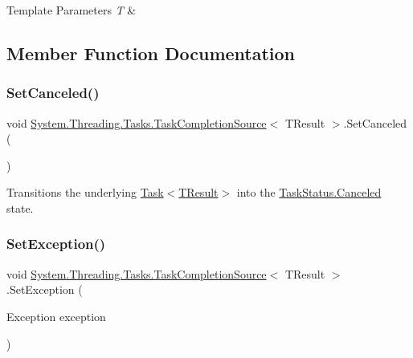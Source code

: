 \begin{DoxyTemplParams}{Template Parameters}
{\em T} & \\
\hline
\end{DoxyTemplParams}


\subsection{Member Function Documentation}
\mbox{\label{class_system_1_1_threading_1_1_tasks_1_1_task_completion_source_a051f19b8e8e34b2a19169420d6f49855}} 
\subsubsection{\texorpdfstring{Set\+Canceled()}{SetCanceled()}}
{\footnotesize\ttfamily void \hyperlink{class_system_1_1_threading_1_1_tasks_1_1_task_completion_source}{System.\+Threading.\+Tasks.\+Task\+Completion\+Source}$<$ T\+Result $>$.Set\+Canceled (\begin{DoxyParamCaption}{ }\end{DoxyParamCaption})\hspace{0.3cm}{\ttfamily [inline]}}



Transitions the underlying \hyperlink{class_system_1_1_threading_1_1_tasks_1_1_task}{Task$<$\+T\+Result$>$} into the \hyperlink{namespace_system_1_1_threading_1_1_tasks_a60ab70a6c84627853d6b1056f1edebcfa0e22fe7d45f8e5632a4abf369b24e29c}{Task\+Status.\+Canceled} state. 

\mbox{\label{class_system_1_1_threading_1_1_tasks_1_1_task_completion_source_a8d3f5e987ba59b9e13bec97fe318474f}} 
\subsubsection{\texorpdfstring{Set\+Exception()}{SetException()}}
{\footnotesize\ttfamily void \hyperlink{class_system_1_1_threading_1_1_tasks_1_1_task_completion_source}{System.\+Threading.\+Tasks.\+Task\+Completion\+Source}$<$ T\+Result $>$.Set\+Exception (\begin{DoxyParamCaption}\item[{Exception}]{exception }\end{DoxyParamCaption})\hspace{0.3cm}{\ttfamily [inline]}}



